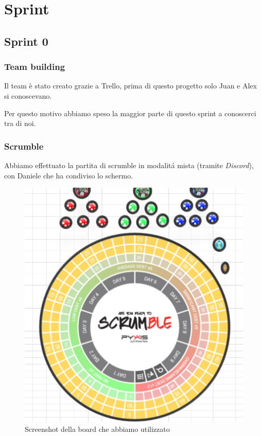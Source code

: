 \documentclass{article}
\begin{document}
\section{Sprint}
\subsection{Sprint 0}
\subsubsection{ Team building }
Il team \`e stato creato grazie a Trello, prima di questo progetto solo Juan e Alex si conoscevano.

Per questo motivo abbiamo speso la maggior parte di questo sprint a conoscerci tra di noi.

\subsubsection{ Scrumble }
Abbiamo effettuato la partita di scrumble in modalit\'a mista (tramite \textit{Discord}), con Daniele che ha condiviso lo schermo.

\begin{figure}[H]
    \centering
    \includegraphics[scale=0.30]{scrumble/scrumble_board.png}
    \caption{Screenshot della board che abbiamo utilizzato}
    \label{fig:scrumbleboard}
\end{figure}
\end{document}

